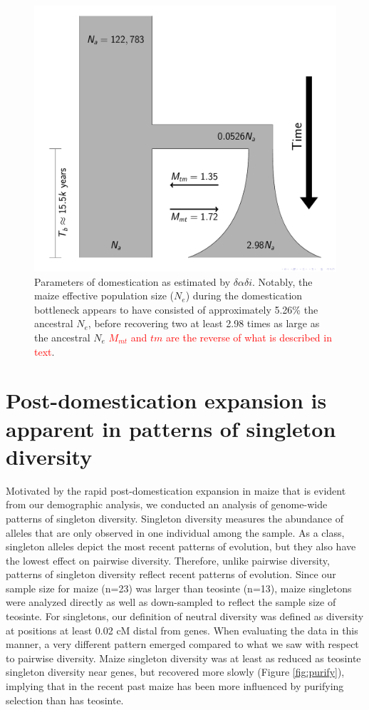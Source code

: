 \documentclass{pnastwo}
\newcommand{\jri}[1]{\textcolor{red}{\scriptsize #1}}
\begin{document}
\begin{article}
\begin{figure}[!htb]
\centering
\includegraphics[width=.4\textwidth]{FigsAndFiles/DomesticationModel/domesticationModel.pdf}
\caption{Parameters of domestication as estimated by $\delta\alpha\delta{i}$. Notably,
  the maize effective population size ($N_e$) during the domestication
  bottleneck appears to have consisted of approximately 5.26\%
  the ancestral $N_e$, before recovering two at least 2.98
  times as large as the ancestral $N_e$ \jri{$M_{mt}$ and $tm$ are the reverse of what is described in text}. \label{fig:bottleneck} }
\end{figure}

\section{Post-domestication expansion is apparent in patterns of singleton diversity}
Motivated by the rapid post-domestication expansion in maize that is evident from our demographic analysis, we conducted an analysis of genome-wide patterns of singleton diversity. Singleton diversity measures the abundance of alleles that are only observed in one individual among the sample. As a class, singleton alleles depict the most recent patterns of evolution, but
they also have the lowest effect on pairwise diversity. Therefore, unlike
pairwise diversity, patterns of singleton
diversity reflect recent patterns of evolution. Since our sample size
for maize (n=23) was larger than teosinte (n=13), maize singletons were
analyzed directly as well as down-sampled to reflect the sample size of
teosinte. For singletons, our definition of
neutral diversity was defined as diversity at positions at
least 0.02 cM distal from genes. When
evaluating the data in this manner, a very different pattern
emerged compared to what we saw with respect to pairwise diversity. Maize singleton diversity was at least as reduced as teosinte singleton
diversity near genes, but recovered more slowly
(Figure \ref{fig:purify}), implying that in the
recent past maize has been more influenced by purifying selection than has
teosinte.


\end{article}
\end{document}
